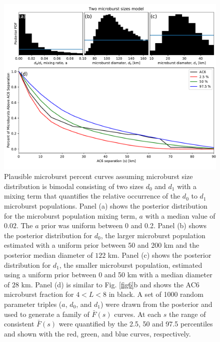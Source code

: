 \documentclass[draft]{agujournal2019}
\begin{document}
\begin{figure}
\includegraphics[width=\textwidth]{fig7.pdf}
\caption{Plausible microburst percent curves assuming microburst size distribution is bimodal consisting of two sizes $d_0$ and $d_1$ with a mixing term that quantifies the relative occurrence of the $d_0$ to $d_1$ microburst populations. Panel (a) shows the posterior distribution for the microburst population mixing term, $a$ with a median value of $0.02$. The $a$ prior was uniform between 0 and 0.2. Panel (b) shows the posterior distribution for $d_0$, the larger microburst population estimated with a uniform prior between 50 and 200 km and the posterior median diameter of $122$ km. Panel (c) shows the posterior distribution for $d_1$, the smaller microburst population, estimated using a uniform prior between 0 and 50 km with a median diameter of $28$ km. Panel (d) is similar to Fig. \ref{fig6}b and shows the AC6 microburst fraction for $4 < L < 8$ in black. A set of 1000 random parameter triples ($a$, $d_0$, and $d_1$) were drawn from the posterior and used to generate a family of $\bar{F}(s)$ curves. At each $s$ the range of consistent $\bar{F}(s)$ were quantified by the 2.5, 50 and 97.5 percentiles and shown with the red, green, and blue curves, respectively.} 
\label{fig7}
\end{figure}
\end{document}
